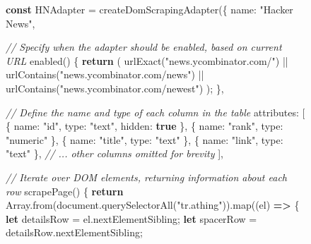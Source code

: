 \documentclass[sigplan,screen,10pt,anonymous,review]{acmart}
\newenvironment{Shaded}{}{}
\newcommand{\AttributeTok}[1]{\textcolor[rgb]{0.49,0.56,0.16}{#1}}
\newcommand{\CommentTok}[1]{\textcolor[rgb]{0.38,0.63,0.69}{\textit{#1}}}
\newcommand{\ControlFlowTok}[1]{\textcolor[rgb]{0.00,0.44,0.13}{\textbf{#1}}}
\newcommand{\DataTypeTok}[1]{\textcolor[rgb]{0.56,0.13,0.00}{#1}}
\newcommand{\KeywordTok}[1]{\textcolor[rgb]{0.00,0.44,0.13}{\textbf{#1}}}
\newcommand{\NormalTok}[1]{#1}
\newcommand{\OperatorTok}[1]{\textcolor[rgb]{0.40,0.40,0.40}{#1}}
\newcommand{\StringTok}[1]{\textcolor[rgb]{0.25,0.44,0.63}{#1}}
\newcommand{\VariableTok}[1]{\textcolor[rgb]{0.10,0.09,0.49}{#1}}
\begin{document}
\begin{figure}

\begin{Shaded}
\begin{Highlighting}[]
\KeywordTok{const}\NormalTok{ HNAdapter }\OperatorTok{=} \AttributeTok{createDomScrapingAdapter}\NormalTok{(}\OperatorTok{\{}
  \DataTypeTok{name}\OperatorTok{:} \StringTok{"Hacker News"}\OperatorTok{,}

  \CommentTok{// Specify when the adapter should be enabled, based on current URL}
  \AttributeTok{enabled}\NormalTok{() }\OperatorTok{\{}
    \ControlFlowTok{return}\NormalTok{ (}
      \AttributeTok{urlExact}\NormalTok{(}\StringTok{"news.ycombinator.com/"}\NormalTok{) }\OperatorTok{||}
      \AttributeTok{urlContains}\NormalTok{(}\StringTok{"news.ycombinator.com/news"}\NormalTok{) }\OperatorTok{||}
      \AttributeTok{urlContains}\NormalTok{(}\StringTok{"news.ycombinator.com/newest"}\NormalTok{)}
\NormalTok{    )}\OperatorTok{;}
  \OperatorTok{\},}

  \CommentTok{// Define the name and type of each column in the table}
  \DataTypeTok{attributes}\OperatorTok{:}\NormalTok{ [}
    \OperatorTok{\{} \DataTypeTok{name}\OperatorTok{:} \StringTok{"id"}\OperatorTok{,} \DataTypeTok{type}\OperatorTok{:} \StringTok{"text"}\OperatorTok{,} \DataTypeTok{hidden}\OperatorTok{:} \KeywordTok{true} \OperatorTok{\},}
    \OperatorTok{\{} \DataTypeTok{name}\OperatorTok{:} \StringTok{"rank"}\OperatorTok{,} \DataTypeTok{type}\OperatorTok{:} \StringTok{"numeric"} \OperatorTok{\},}
    \OperatorTok{\{} \DataTypeTok{name}\OperatorTok{:} \StringTok{"title"}\OperatorTok{,} \DataTypeTok{type}\OperatorTok{:} \StringTok{"text"} \OperatorTok{\},}
    \OperatorTok{\{} \DataTypeTok{name}\OperatorTok{:} \StringTok{"link"}\OperatorTok{,} \DataTypeTok{type}\OperatorTok{:} \StringTok{"text"} \OperatorTok{\},}
    \CommentTok{// ... other columns omitted for brevity}
\NormalTok{  ]}\OperatorTok{,}

  \CommentTok{// Iterate over DOM elements, returning information about each row}
  \AttributeTok{scrapePage}\NormalTok{() }\OperatorTok{\{}
    \ControlFlowTok{return} \VariableTok{Array}\NormalTok{.}\AttributeTok{from}\NormalTok{(}\VariableTok{document}\NormalTok{.}\AttributeTok{querySelectorAll}\NormalTok{(}\StringTok{"tr.athing"}\NormalTok{)).}\AttributeTok{map}\NormalTok{((el) }\KeywordTok{=>} \OperatorTok{\{}
      \KeywordTok{let}\NormalTok{ detailsRow }\OperatorTok{=} \VariableTok{el}\NormalTok{.}\AttributeTok{nextElementSibling}\OperatorTok{;}
      \KeywordTok{let}\NormalTok{ spacerRow }\OperatorTok{=} \VariableTok{detailsRow}\NormalTok{.}\AttributeTok{nextElementSibling}\OperatorTok{;}


\end{Highlighting}
\end{Shaded}
\end{figure}
\end{document}
